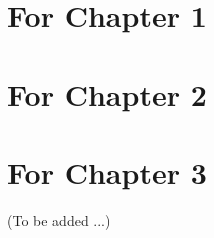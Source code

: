 \section{For Chapter 1}



\clearpage
\section{For Chapter 2}



\section{For Chapter 3}
(To be added ...)
